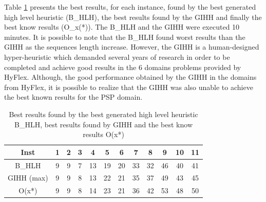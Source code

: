 \documentclass[conference]{IEEEtran}
\begin{document}
Table \ref{tab:gihhandbhlh} presents the best results, for each instance, found by the best generated high level heuristic (B_HLH), the best results found by the GIHH \cite{misir2012intelligent} and finally the best know results (O_x(*)). The B_HLH and the GIHH were executed 10 minutes. It is possible to note that the B_HLH found worst results than the GIHH as the sequences length increase. However, the GIHH is a human-designed hyper-heuristic which demanded several years of research in order to be completed and achieve good results in the 6 domains problems provided by HyFlex. Although, the good performance obtained by the GIHH in the domains from HyFlex,  it is possible to realize that the GIHH was also unable to achieve the best known results for the PSP domain.

\begin{table}[]
	\centering
	\caption{Best results found by the best generated high level heuristic B_HLH, best results found by GIHH and the best know results O(x*)}
	\label{tab:gihhandbhlh}
	\begin{tabular}{cccccccccccc}
		Inst         & 1 & 2 & 3 & 4  & 5  & 6  & 7  & 8  & 9  & 10 & 11 \\ \hline
		B\_HLH  & 9 & 9 & 7 & 13 & 19 & 20 & 33 & 32 & 46 & 40 & 41 \\ \hline
		GIHH (max)   & 9 & 9 & 8 & 13 & 22 & 21 & 35 & 37 & 49 & 43 & 45 \\ \hline
		O(x*)        & 9 & 9 & 8 & 14 & 23 & 21 & 36 & 42 & 53 & 48 & 50
	\end{tabular}
\end{table}




%
%
%


 
 
\end{document}
